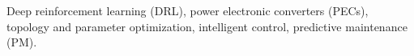 \begin{IEEEkeywords}
Deep reinforcement learning (DRL), 
power electronic converters (PECs), 
topology and parameter optimization, 
intelligent control, 
predictive maintenance (PM). 
\end{IEEEkeywords}
